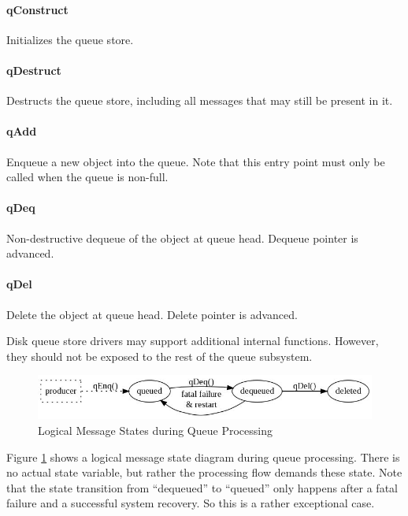 \documentclass[a4paper,10pt]{article}
\begin{document}
\paragraph{qConstruct} Initializes the queue store.

\paragraph{qDestruct} Destructs the queue store, including all messages that may still be present in it.

\paragraph{qAdd} Enqueue a new object into the queue. Note that this entry point must only be called when the queue is non-full.

\paragraph{qDeq} Non-destructive dequeue of the object at queue head. Dequeue pointer is advanced.

\paragraph{qDel} Delete the object at queue head. Delete pointer is advanced.

Disk queue store drivers may support additional internal functions. However, they should not be exposed to the rest of the queue subsystem.

\begin{figure}
\begin{center}
\includegraphics[scale=0.4]{queue_msg_state.jpeg}
\end{center}
\caption{Logical Message States during Queue Processing}
\label{fig_queue_msg_state}
\end{figure}

Figure \ref{fig_queue_msg_state} shows a logical message state diagram during queue processing. There is no actual state variable, but rather the processing flow demands these state. Note that the state transition from ``dequeued'' to ``queued'' only happens after a fatal failure and a successful system recovery. So this is a rather exceptional case.
\end{document}
